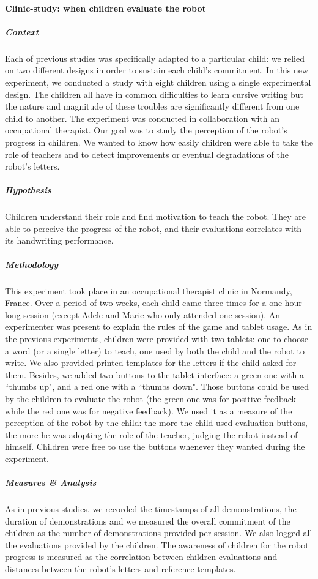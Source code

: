 \documentclass[10pt,a4paper]{article}
\begin{document}
\paragraph{Clinic-study: when children evaluate the robot}
\subparagraph{Context}
Each of previous studies was specifically adapted to a particular child: we relied on two different
designs in order to sustain each child's commitment.
In this new experiment, we conducted a study with eight children using a single experimental design. The children all have in common difficulties to learn
cursive writing but the nature and magnitude of these troubles are significantly
different from one child to another. The experiment was conducted in collaboration with an occupational therapist. Our goal was to study the perception of the robot's progress in children. We wanted to know how easily children were able to take the role of teachers and to detect improvements or eventual degradations of the robot's letters.
\subparagraph{Hypothesis}
Children understand their role and find motivation to teach the robot. They are able to perceive the progress of the robot, and their evaluations correlates with its handwriting performance.
\subparagraph{Methodology}
This experiment took place in an occupational therapist clinic
in Normandy, France. Over a period of two weeks, each child came three times for a one hour long
session (except Adele and Marie who only attended one session). An experimenter was present to explain the rules of the game and tablet usage. As in the previous experiments, children were provided with two tablets: one to choose a word (or a single letter) to teach, one
used by both the child and the robot to write. We also provided printed templates for the letters if the child asked for them. 
Besides, we added two buttons to the tablet interface: a green one with a ``thumbs up", and
a red one with a ``thumbs down". Those buttons could be used by the children to evaluate the
robot (the green one was for positive feedback while the red one was for negative feedback). 
We used it as a measure of the perception of the robot by the child: the more the
child used evaluation buttons, the more he was adopting the role of the teacher, judging the
robot instead of himself. Children were free to use the buttons whenever they wanted during the experiment.
\subparagraph{Measures \& Analysis}
As in previous studies, we recorded the timestamps of all demonstrations, the duration of demonstrations and we measured the overall commitment of the children as the number of demonstrations provided per session. 
We also logged all the evaluations provided by the children. The awareness of children for the robot progress is measured as the correlation between children evaluations and distances between the robot's letters and reference templates.
\end{document}
